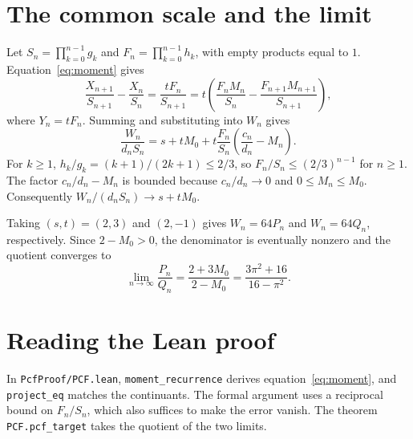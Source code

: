 \documentclass[11pt]{article}
\begin{document}
\section{The common scale and the limit}
Let \(S_n=\prod_{k=0}^{n-1}g_k\) and
\(F_n=\prod_{k=0}^{n-1}h_k\), with empty products equal to \(1\).
Equation~\eqref{eq:moment} gives
\[
 \frac{X_{n+1}}{S_{n+1}}-\frac{X_n}{S_n}
 =\frac{tF_n}{S_{n+1}}
 =t\left(\frac{F_nM_n}{S_n}-\frac{F_{n+1}M_{n+1}}{S_{n+1}}\right),
\]
where \(Y_n=tF_n\). Summing and substituting into \(W_n\) gives
\[
 \frac{W_n}{d_nS_n}=s+tM_0+
 t\frac{F_n}{S_n}\left(\frac{c_n}{d_n}-M_n\right).
\]
For \(k\ge1\), \(h_k/g_k=(k+1)/(2k+1)\le2/3\), so
\(F_n/S_n\le(2/3)^{n-1}\) for \(n\ge1\).
The factor \(c_n/d_n-M_n\) is bounded because \(c_n/d_n\to0\)
and \(0\le M_n\le M_0\).
Consequently \(W_n/(d_nS_n)\to s+tM_0\).

Taking \((s,t)=(2,3)\) and \((2,-1)\) gives \(W_n=64P_n\)
and \(W_n=64Q_n\), respectively. Since \(2-M_0>0\), the denominator
is eventually nonzero and the quotient converges to
\[
 \lim_{n\to\infty}\frac{P_n}{Q_n}
 =\frac{2+3M_0}{2-M_0}=\frac{3\pi^2+16}{16-\pi^2}.
\]
\section*{Reading the Lean proof}
In \texttt{PcfProof/PCF.lean}, \texttt{moment\_recurrence} derives
equation~\eqref{eq:moment}, and \texttt{project\_eq} matches the continuants.
The formal argument uses a reciprocal bound on \(F_n/S_n\), which
also suffices to make the error vanish. The theorem
\texttt{PCF.pcf\_target} takes the quotient of the two limits.
\end{document}
